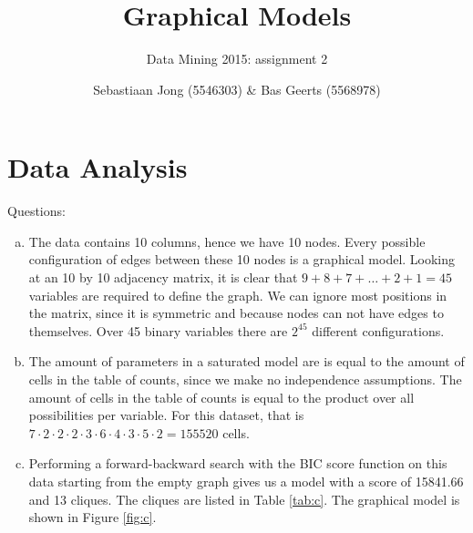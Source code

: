 \documentclass[a4paper,12pt]{scrartcl}
\begin{document}
\title{Graphical Models}
\subtitle{Data Mining 2015: assignment 2}
\author{Sebastiaan Jong (5546303) \& Bas Geerts (5568978)}
\date{}
\maketitle
\section{Data Analysis}
Questions:
	\begin{enumerate}[(a)]
		\item The data contains 10 columns, hence we have 10 nodes. Every possible configuration of edges between these 10 nodes is a graphical model. Looking at an 10 by 10 adjacency matrix, it is clear that $9 + 8 + 7 + \dots + 2 + 1 = 45$ variables are required to define the graph. We can ignore most positions in the matrix, since it is symmetric and because nodes can not have edges to themselves. Over 45 binary variables there are $2^{45}$ different configurations. 
		\item The amount of parameters in a saturated model are is equal to the amount of cells in the table of counts, since we make no independence assumptions. The amount of cells in the table of counts is equal to the product over all possibilities per variable. For this dataset, that is $7 \cdot 2 \cdot 2 \cdot 2 \cdot 3 \cdot 6 \cdot 4 \cdot 3 \cdot 5 \cdot 2 = 155520$ cells.
		\item Performing a forward-backward search with the BIC score function on this data starting from the empty graph gives us a model with a score of 15841.66 and 13 cliques. The cliques are listed in Table \ref{tab:c}. The graphical model is shown in Figure \ref{fig:c}.


\end{enumerate}
\end{document}
